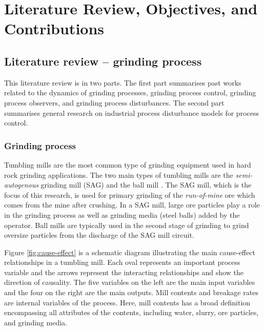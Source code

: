 \chapter{Literature Review, Objectives, and Contributions}
\label{chap-lit-review}

\section{Literature review – grinding process}

This literature review is in two parts. The first part summarises past works related to the dynamics of grinding processes, grinding process control, grinding process observers, and grinding process disturbances. The second part summarises general research on industrial process disturbance models for process control.

\subsection{Grinding process}

Tumbling mills are the most common type of grinding equipment used in hard rock grinding applications. The two main types of tumbling mills are the \textit{semi-autogenous} grinding mill (SAG) and the ball mill \citep{king_chapter_2012}. The SAG mill, which is the focus of this research, is used for primary grinding of the \textit{run-of-mine} ore which comes from the mine after crushing. In a SAG mill, large ore particles play a role in the grinding process as well as grinding media (steel balls) added by the operator. Ball mills are typically used in the second stage of grinding to grind oversize particles from the discharge of the SAG mill circuit.

Figure \ref{fig:cause-effect} is a schematic diagram illustrating the main cause-effect relationships in a tumbling mill. Each oval represents an important process variable and the arrows represent the interacting relationships and show the direction of causality. The five variables on the left are the main input variables and the four on the right are the main outputs. Mill contents and breakage rates are internal variables of the process. Here, mill contents has a broad definition encompassing all attributes of the contents, including water, slurry, ore particles, and grinding media.

